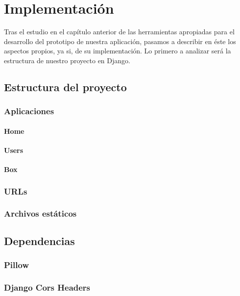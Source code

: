 \chapter{Implementación}
\label{cap:implementacion}

Tras el estudio en el capítulo anterior de las herramientas apropiadas para el desarrollo del prototipo de nuestra aplicación, pasamos a describir en éste los aspectos propios, ya si, de su implementación. Lo primero a analizar será la estructura de nuestro proyecto en Django.

\section{Estructura del proyecto}

\subsection{Aplicaciones}

\subsubsection{Home}

\subsubsection{Users}

\subsubsection{Box}

\subsection{URLs}

\subsection{Archivos estáticos}

\section{Dependencias}

\subsection{Pillow}

\subsection{Django Cors Headers}

